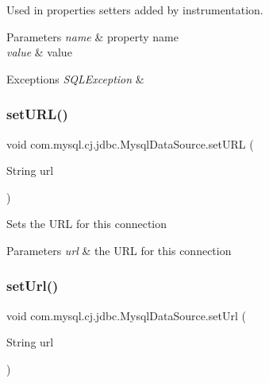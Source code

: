 Used in properties setters added by instrumentation.


\begin{DoxyParams}{Parameters}
{\em name} & property name \\
\hline
{\em value} & value \\
\hline
\end{DoxyParams}

\begin{DoxyExceptions}{Exceptions}
{\em S\+Q\+L\+Exception} & \\
\hline
\end{DoxyExceptions}
\mbox{\label{classcom_1_1mysql_1_1cj_1_1jdbc_1_1_mysql_data_source_a03d52b5b48fb303375e5c1b35b7f52f9}} 
\subsubsection{\texorpdfstring{set\+U\+R\+L()}{setURL()}}
{\footnotesize\ttfamily void com.\+mysql.\+cj.\+jdbc.\+Mysql\+Data\+Source.\+set\+U\+RL (\begin{DoxyParamCaption}\item[{String}]{url }\end{DoxyParamCaption})}

Sets the U\+RL for this connection


\begin{DoxyParams}{Parameters}
{\em url} & the U\+RL for this connection \\
\hline
\end{DoxyParams}
\mbox{\label{classcom_1_1mysql_1_1cj_1_1jdbc_1_1_mysql_data_source_adefc4cd844fa0cae59fcf49163692e4e}} 
\subsubsection{\texorpdfstring{set\+Url()}{setUrl()}}
{\footnotesize\ttfamily void com.\+mysql.\+cj.\+jdbc.\+Mysql\+Data\+Source.\+set\+Url (\begin{DoxyParamCaption}\item[{String}]{url }\end{DoxyParamCaption})}

